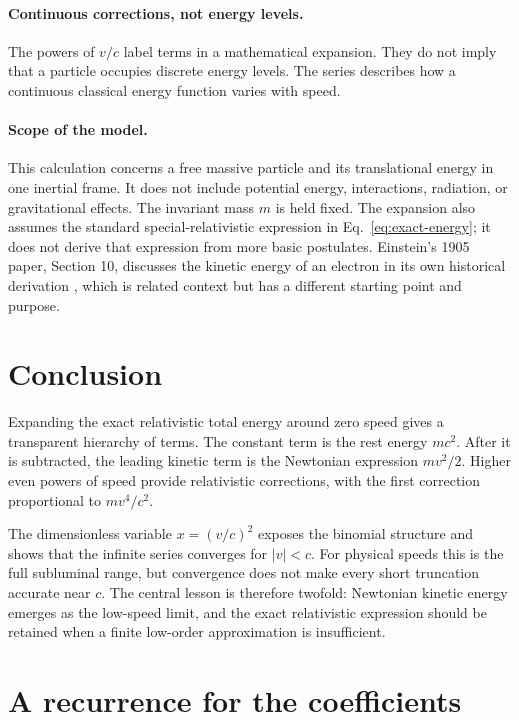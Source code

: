\documentclass[12pt]{article}
\begin{document}
\paragraph{Continuous corrections, not energy levels.}
The powers of $v/c$ label terms in a mathematical expansion. They do not imply that a particle occupies discrete energy levels. The series describes how a continuous classical energy function varies with speed.

\paragraph{Scope of the model.}
This calculation concerns a free massive particle and its translational energy in one inertial frame. It does not include potential energy, interactions, radiation, or gravitational effects. The invariant mass $m$ is held fixed. The expansion also assumes the standard special-relativistic expression in Eq.~\eqref{eq:exact-energy}; it does not derive that expression from more basic postulates. Einstein's 1905 paper, Section 10, discusses the kinetic energy of an electron in its own historical derivation \cite{Einstein1905}, which is related context but has a different starting point and purpose.

\section{Conclusion}

Expanding the exact relativistic total energy around zero speed gives a transparent hierarchy of terms. The constant term is the rest energy $mc^2$. After it is subtracted, the leading kinetic term is the Newtonian expression $mv^2/2$. Higher even powers of speed provide relativistic corrections, with the first correction proportional to $mv^4/c^2$.

The dimensionless variable $x=(v/c)^2$ exposes the binomial structure and shows that the infinite series converges for $|v|<c$. For physical speeds this is the full subluminal range, but convergence does not make every short truncation accurate near $c$. The central lesson is therefore twofold: Newtonian kinetic energy emerges as the low-speed limit, and the exact relativistic expression should be retained when a finite low-order approximation is insufficient.

\appendix
\section{A recurrence for the coefficients}
\end{document}
